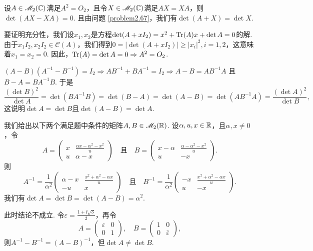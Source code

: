 \setcounter{solution}{70}

\begin{solution}
  设$A\in\mathscr M_2(\mathbb C)$满足$A^2=O_2$，且令$X\in\mathscr M_2(\mathbb C)$满足$AX=XA$，则$\det(AX-XA)=0$. 且由问题 \ref{problem2.67}，我们有$\det(A+X)=\det X$.

  要证明充分性，我们设$x_1,x_2$是方程$\det(A+xI_2)=x^2+\operatorname{Tr}(A)x+\det A=0$的解. 由于$x_1I_2,x_2I_2\in\mathscr C(A)$，我们得到$0=|\det(A+xI_2)|\ge|x_i|^2,i=1,2$，这意味着$x_1=x_2=0$. 因此，$\operatorname{Tr}(A)=\det A=0\Rightarrow A^2=O_2$.
\end{solution}

\begin{solution}
  \begin{inparaenum}[(a)]
    \item $(A-B)(A^{-1}-B^{-1}) = I_2\Rightarrow AB^{-1} + BA^{-1}
    =I_2 \Rightarrow A-B=AB^{-1}A$ 且 $B-A=BA^{-1}B$. 于是
    \[
      \frac{(\det B)^2}{\det A} = \det(BA^{-1}B) =
      \det(B - A) = \det(A - B) = \det(AB^{-1}A) =
      \frac{(\det A)^2}{\det B},
    \]
    这说明$\det A=\det B$且$\det(A-B)=\det A$.

    我们给出以下两个满足题中条件的矩阵$A,B\in\mathscr M_2(\mathbb R)$. 设$\alpha,
    u,x\in\mathbb R$，且$\alpha,x\ne0$，令
    \[
      A = \begin{pmatrix}
        x & \frac{\alpha x- \alpha^2 - x^2} u \\
        u & \alpha - x
      \end{pmatrix}  \quad \text{且}\quad
      B = \begin{pmatrix}
        x - \alpha & \frac{\alpha - \alpha^2 - x^2} u \\
        u & - x
      \end{pmatrix}.
    \]
    则
    \[
      A^{-1} = \frac1{\alpha^2} \begin{pmatrix}
        \alpha - x & \frac{x^2 + \alpha^2-\alpha x}u \\
        -u & x
      \end{pmatrix} \quad \text{且} \quad
      B^{-1} = \frac1{\alpha^2} \begin{pmatrix}
        -x & \frac{x^2 + \alpha^2-\alpha x}u \\
        u & -x
      \end{pmatrix}.
    \]
    我们有$\det A=\det B = \det(A-B)=\alpha^2$.

    \item 此时结论不成立. 令$\varepsilon=\frac{1+\ii\sqrt3}2$，再令
        \[
          A = \begin{pmatrix}
            \varepsilon & 0 \\
            0 & 1
          \end{pmatrix},\quad B = \begin{pmatrix}
            1 & 0 \\
            0 & \bar\varepsilon
          \end{pmatrix},
        \]
        则$A^{-1}-B^{-1}=(A-B)^{-1}$，但$\det A\ne \det B$.
  \end{inparaenum}
\end{solution}

